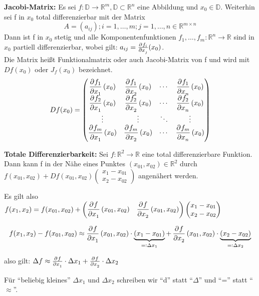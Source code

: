 \documentclass[fontset=ubuntu,12pt,a4paper,fleqn]{article}
\begin{document}
\begin{multicols}{2}
\textbf{Jacobi-Matrix:}
Es sei \(f:\mathbb{D}\to \mathbb{R}^m,\mathbb{D}\subset\mathbb{R}^n\) eine Abbildung und \(x_0\in\mathbb{D}\). Weiterhin sei f in \(x_0\) total differenzierbar mit der Matrix
\[A=(a_{ij});i=1,\dots,m;j=1,\dots,n \in\mathbb{R}^{m\times n}\]
Dann ist f in \(x_0\) stetig und alle Komponentenfunktionen \(f_1,\dots,f_m:\mathbb{R}^n\to\mathbb{R}\) sind in \(x_0\) partiell differenzierbar, wobei gilt: \(a_{ij}=\pd{f_i}{x_j}(x_0)\).\\
Die Matrix heißt Funktionalmatrix oder auch Jacobi-Matrix von f und wird mit \(Df(x_0)\) oder \(J_f(x_0)\) bezeichnet.
\[Df(x_0)=\begin{pmatrix}
\dpd{f_1}{x_1}(x_0) & \dpd{f_1}{x_2}(x_0) & \cdots & \dpd{f_1}{x_n}(x_0) \\
\dpd{f_2}{x_1}(x_0) & \dpd{f_2}{x_2}(x_0) & \cdots & \dpd{f_2}{x_n}(x_0) \\
\vdots & \vdots & \ddots & \vdots \\
\dpd{f_m}{x_1}(x_0) & \dpd{f_m}{x_2}(x_0) & \cdots & \dpd{f_m}{x_n}(x_0)
\end{pmatrix}\]
\end{multicols}
\textbf{Totale Differenzierbarkeit:}
Sei \(f:\mathbb{R}^2\to\mathbb{R}\) eine total differenzierbare Funktion. Dann kann f in der Nähe eines Punktes \((x_{01},x_{02})\in\mathbb{R}^2\) durch \(f(x_{01},x_{02})+Df(x_{01},x_{02})\begin{pmatrix}x_1-x_{01} \\ x_2-x_{02}\end{pmatrix}\) angenähert werden.

Es gilt also \(f(x_1,x_2)=f(x_{01},x_{02})+\begin{pmatrix}
\dpd{f}{x_1}(x_{01},x_{02}) & \dpd{f}{x_2}(x_{01},x_{02})\end{pmatrix}\begin{pmatrix}
x_1-x_{01} \\ x_2-x_{02}
\end{pmatrix}\)

\[f(x_1,x_2)-f(x_{01},x_{02})\approx\dpd{f}{x_1}(x_{01},x_{02})\cdot\underbrace{(x_1-x_{01})}_{=:\Delta x_1} + \dpd{f}{x_2}(x_{01},x_{02})\cdot\underbrace{(x_2-x_{02})}_{=:\Delta x_2}\]

also gilt: \(\Delta f\approx \pd{f}{x_1}\cdot\Delta x_1 + \pd{f}{x_2}\cdot\Delta x_2\)

Für \enquote{beliebig kleines} \(\Delta x_1\) und \(\Delta x_2\) schreiben wir \enquote{d} statt \enquote{\(\Delta\)} und \enquote{=} statt \enquote{\(\approx\)}.
\end{document}
